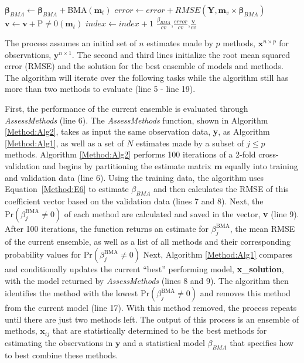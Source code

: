 \documentclass[journal=jpcbfk, manuscript=article]{achemso}
\newcommand{\+}[1]{\ensuremath{\mathbf{#1}}}
\begin{document}
\begin{table}[t]
\begin{minipage}[t]{0.45\linewidth}
\begin{algorithm}[H]
\begin{algorithmic}[1]
{					\; 
					\STATE $\boldsymbol{\beta}_{BMA} \leftarrow \boldsymbol{\beta}_{BMA} + $BMA$(\textbf{m}_{t})$ \; 
					\STATE $error \leftarrow error + RMSE(\textbf{Y}, \textbf{m}_{v} \times \boldsymbol{\beta}_{BMA})$\; 
					\STATE $\textbf{v} \leftarrow \textbf{v} + $P$\neq$0$(\textbf{m}_{t})$ \; 
					\STATE $index \leftarrow index + 1$ 
				\ENDWHILE\; 
				\RETURN $\frac{\beta_{BMA}}{cv}$,$\frac{error}{cv}$,$\frac{\textbf{v}}{cv}$\; } 
			\end{algorithmic}
		\end{algorithm} 
	\end{minipage}
\end{table}
The process assumes an initial set of $n$ estimates made by $p$ methods, $\textbf{x}^{n \times p}$ for observations, $\textbf{y}^{n \times 1}$.
The second and third lines initialize the root mean squared error (RMSE) and the solution for the best ensemble of models and methods.
The algorithm will iterate over the following tasks while the algorithm still has more than two methods to evaluate (line 5 - line 19).

First, the performance of the current ensemble is evaluated through \emph{AssessMethods} (line 6).
The \emph{AssessMethods} function, shown in Algorithm \ref{Method:Alg2}, takes as input the same observation data, \textbf{y}, as Algorithm \ref{Method:Alg1}, as well as a set of $N$ estimates made by a subset of $j \leq p$ methods.
Algorithm \ref{Method:Alg2} performs 100 iterations of a 2-fold cross-validation and begins by partitioning the estimate matrix $\mathbf{m}$ equally into training and validation data (line 6).
Using the training data, the algorithm uses Equation~\ref{Method:E6} to estimate $\beta_{BMA}$ and then calculates the RMSE of this coefficient vector based on the validation data (lines 7 and 8).
Next, the $\mathrm{Pr}(\beta_j^{\text{BMA}}\neq 0)$ of each method are calculated and saved in the vector, \textbf{v} (line 9).
After 100 iterations, the function returns an estimate for $\beta_j^{\text{BMA}}$, the mean RMSE of the current ensemble, as well as a list of all methods and their corresponding probability values for $\mathrm{Pr}(\beta_j^{\text{BMA}}\neq 0)$
Next, Algorithm \ref{Method:Alg1} compares and conditionally updates the current ``best'' performing model, \textbf{x\_solution}, with the model returned by \emph{AssessMethods} (lines 8 and 9).
The algorithm then identifies the method with the lowest $\mathrm{Pr} (\beta_j^{\text{BMA}}\neq 0)$ and removes this method from the current model (line 17). With this method removed, the process repeats until there are just two methods left.
The output of this process is an ensemble of methods, $\textbf{x}_{ij}$ that are statistically determined to be the best methods for estimating the observations in $\mathbf{y}$ and a statistical model $\beta_{BMA}$ that specifies how to best combine these methods.  
\end{document}
